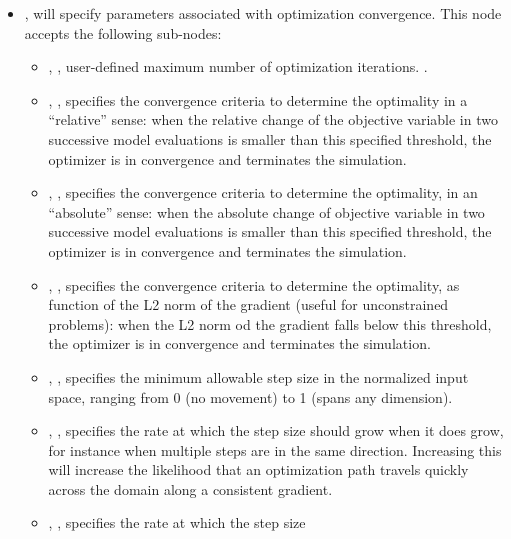 \constantVariablesDescription
\begin{itemize}
\item {},  will specify parameters associated with optimization
convergence. This node accepts the following sub-nodes:
  \begin{itemize}
  \item {}, , user-defined maximum number of optimization iterations. .
  \item {}, , specifies the convergence criteria to determine the optimality
  in a ``relative'' sense: when the relative change of the objective variable in two successive model evaluations is smaller than
  this specified threshold, the  optimizer is in convergence and terminates the simulation.
  \item {}, , specifies the convergence criteria to determine the optimality,
  in an ``absolute'' sense: when the absolute change of objective variable in two successive model evaluations is smaller
  than this specified threshold, the  optimizer is in convergence and terminates the simulation.
  \item {}, , specifies the convergence criteria to determine the optimality,
   as function of the L2 norm of the gradient (useful for unconstrained problems): when the L2 norm od the gradient falls below this threshold, the  optimizer is in convergence and terminates the simulation.
  \item {}, , specifies the minimum allowable step size in
    the normalized input space, ranging from 0 (no movement) to 1 (spans any dimension).
  \item {}, , specifies the rate at which the step size
    should grow when it does grow, for instance when multiple steps are in the same direction.  Increasing
    this will increase the likelihood that an optimization path travels quickly across the domain along a
    consistent gradient.
  \item {}, , specifies the rate at which the step size

\end{itemize}
\end{itemize}
